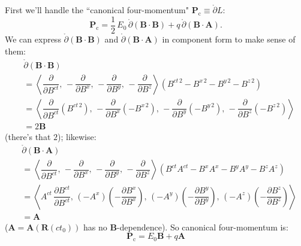 \documentclass[12pt]{article}
\renewcommand{\vv}[1]{\mathbf{#1}}
\begin{document}
First we'll handle the ``canonical four-momentum" $\vv P _\textrm{c} \equiv \mathring{\partialup} L$:
\begin{equation*}
\vv P _\textrm{c} =  \dfrac{1}{2} \, E_0 \, \mathring{\partialup} (\vv B \cdot \vv B) + q \, \mathring{\partialup} (\vv B \cdot \vv A) .
\end{equation*}
We can express $\mathring{\partialup} (\vv B \cdot \vv B)$ and $\mathring{\partialup} (\vv B \cdot \vv A)$ in component form to make sense of them:
\begin{equation*}
\begin{split}
&\mathring{\partialup} (\vv B \cdot \vv B) \\[2pt]
&= \left \langle \dfrac{\partial}{\partial B^{ct}} , \,  - \dfrac{\partial}{\partial B^x} , \, - \dfrac{\partial}{\partial B^y} , \, - \dfrac{\partial}{\partial B^z} \right \rangle \left( B^{ct \, 2} - B^{x \, 2} - B^{y \, 2} - B^{z \, 2} \right) \\[3pt]
&= \left \langle \dfrac{\partial}{\partial B^{ct}} \left( B^{ct \, 2} \right) , \, - \dfrac{\partial}{\partial B^x} \left( - B^{x \, 2} \right) , \, - \dfrac{\partial}{\partial B^y} \left( - B^{y \, 2} \right)  , \, - \dfrac{\partial}{\partial B^z} \left( - B^{z \, 2} \right)  \right \rangle \\[2pt]
&= 2 \vv B
\end{split}
\end{equation*}
(there's that $2$); likewise:
\begin{equation*}
\begin{split}
&\mathring{\partialup} (\vv B \cdot \vv A) \\[2pt]
&= \left \langle \dfrac{\partial}{\partial B^{ct}} , \,  - \dfrac{\partial}{\partial B^x} , \, - \dfrac{\partial}{\partial B^y} , \, - \dfrac{\partial}{\partial B^z} \right \rangle \left( B^{ct} A^{ct} - B^x A^x - B^y A^y - B^z A^z \right) \\[3pt]
&= \left \langle A^{ct} \, \dfrac{\partial B^{ct}}{\partial B^{ct}} , \,  (- A^x) \left( - \dfrac{\partial B^x}{\partial B^x} \right) , \, (-A^y) \left( - \dfrac{\partial B^y}{\partial B^y} \right) , \, (-A^z) \left( - \dfrac{\partial B^z}{\partial B^z} \right) \right \rangle \\[2pt]
&= \vv A 
\end{split}
\end{equation*}
($\vv A = \vv A(\vv R(ct_0))$ has no $\vv B$-dependence). So canonical four-momentum is:
\begin{equation*}
\vv P _\textrm{c} =  E_0 \vv B + q \vv A
\end{equation*}
\end{document}
